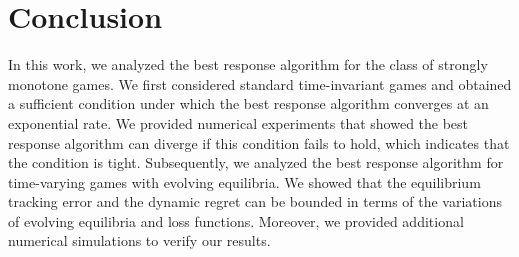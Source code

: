 \section{Conclusion}\label{sec:conclusion}
In this work, we analyzed the best response algorithm for the class of strongly monotone games. We first considered standard time-invariant games and obtained a sufficient condition under which the best response algorithm converges at an exponential rate.
%
We provided numerical experiments that showed the best response algorithm can diverge if this condition fails to hold, which indicates that the condition is tight. Subsequently, we analyzed the best response algorithm for time-varying games with evolving equilibria. We showed that the equilibrium tracking error and the dynamic regret can be bounded in terms of the variations of evolving equilibria and loss functions. 
Moreover, we provided additional numerical simulations to verify our results.
